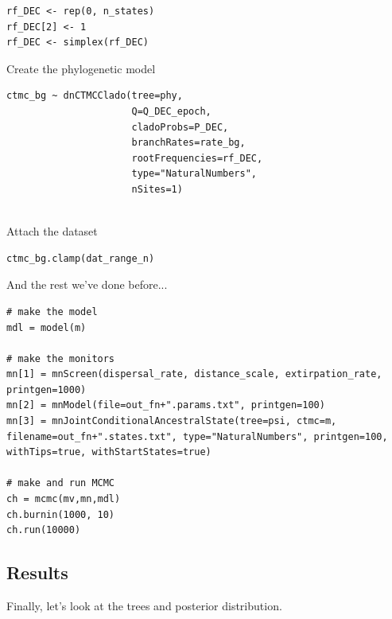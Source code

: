 \begin{snugshade}
\begin{lstlisting}
rf_DEC <- rep(0, n_states)
rf_DEC[2] <- 1
rf_DEC <- simplex(rf_DEC)
\end{lstlisting}
\end{snugshade}


Create the phylogenetic model
\begin{snugshade}
\begin{lstlisting}
ctmc_bg ~ dnCTMCClado(tree=phy,
                      Q=Q_DEC_epoch,
                      cladoProbs=P_DEC,
                      branchRates=rate_bg,
                      rootFrequencies=rf_DEC,
                      type="NaturalNumbers",
                      nSites=1)
                  
\end{lstlisting}
\end{snugshade}


Attach the dataset
\begin{snugshade}
\begin{lstlisting}
ctmc_bg.clamp(dat_range_n)
\end{lstlisting}
\end{snugshade}


And the rest we've done before...
\begin{snugshade}
\begin{lstlisting}
# make the model
mdl = model(m)

# make the monitors
mn[1] = mnScreen(dispersal_rate, distance_scale, extirpation_rate, printgen=1000)
mn[2] = mnModel(file=out_fn+".params.txt", printgen=100)
mn[3] = mnJointConditionalAncestralState(tree=psi, ctmc=m, filename=out_fn+".states.txt", type="NaturalNumbers", printgen=100, withTips=true, withStartStates=true)

# make and run MCMC
ch = mcmc(mv,mn,mdl)
ch.burnin(1000, 10)
ch.run(10000)
\end{lstlisting}
\end{snugshade}

\subsection*{Results}

Finally, let's look at the trees and posterior distribution.

